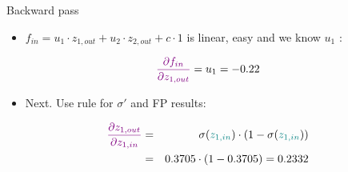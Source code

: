 \begin{vbframe}{Backward pass}
\begin{itemize}
    \item $f_{in} = u_1 \cdot z_{1,out} + u_2 \cdot z_{2,out} + c \cdot 1$ is linear, easy and we know $u_1$ :
  \end{itemize}
  \begin{eqnarray*}
    \textcolor{violet}{\frac{\partial f_{in}}{\partial z_{1,out}}} = u_1 = -0.22
  \end{eqnarray*}
  \begin{figure}
    \centering
  \end{figure}
\framebreak

  \begin{itemize}
    \item Next. Use rule for $\sigma'$ and FP results:
  \end{itemize}
  \begin{eqnarray*}
    \textcolor{violet}{\frac{\partial z_{1,out}}{\partial z_{1,in}}}  &=& \sigma(\textcolor{teal}{z_{1,in}}) \cdot (1-\sigma(\textcolor{teal}{z_{1,in}})) \\&=&  \num[round-mode=places,round-precision=4]{0.3705169} \cdot (1 - \num[round-mode=places,round-precision=4]{0.3705169}) = \num[round-mode=places,round-precision=4]{0.2332341}
  \end{eqnarray*}
  \begin{figure}
    \centering
  \end{figure}
\framebreak


\end{vbframe}
